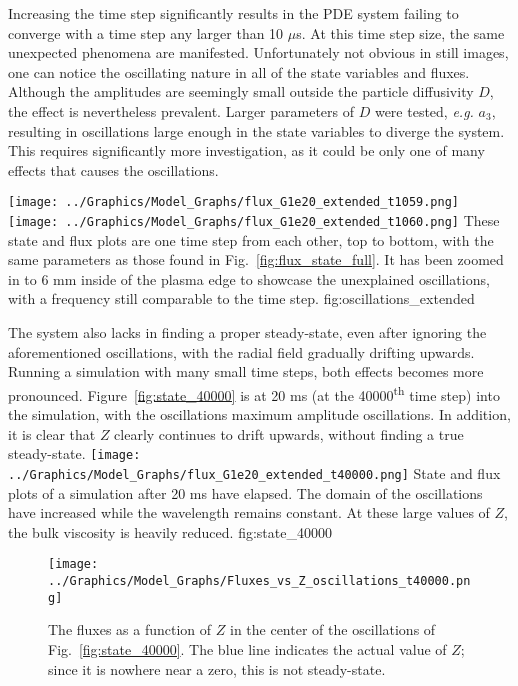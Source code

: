 Increasing the time step significantly results in the PDE system failing to converge with a time step any larger than 10 $\mu$s.
At this time step size, the same unexpected phenomena are manifested.
Unfortunately not obvious in still images, one can notice the oscillating nature in all of the state variables and fluxes.
Although the amplitudes are seemingly small outside the particle diffusivity $D$, the effect is nevertheless prevalent.
Larger parameters of $D$ were tested, \emph{e.g.} $a_3$, resulting in oscillations large enough in the state variables to diverge the system.
This requires significantly more investigation, as it could be only one of many effects that causes the oscillations.

	{\texttt{[image: ../Graphics/Model\_Graphs/flux\_G1e20\_extended\_t1059.png]}
	\texttt{[image: ../Graphics/Model\_Graphs/flux\_G1e20\_extended\_t1060.png]}}
	{These state and flux plots are one time step from each other, top to bottom, with the same parameters as those found in Fig.~\ref{fig:flux_state_full}.
	It has been zoomed in to 6 mm inside of the plasma edge to showcase the unexplained oscillations, with a frequency still comparable to the time step.}
	{fig:oscillations_extended}

The system also lacks in finding a proper steady-state, even after ignoring the aforementioned oscillations, with the radial field gradually drifting upwards.
Running a simulation with many small time steps, both effects becomes more pronounced.
Figure~\ref{fig:state_40000} is at 20 ms (at the 40000\textsuperscript{th} time step) into the simulation, with the oscillations maximum amplitude oscillations.
In addition, it is clear that $Z$ clearly continues to drift upwards, without finding a true steady-state.
	{\texttt{[image: ../Graphics/Model\_Graphs/flux\_G1e20\_extended\_t40000.png]}}
	{State and flux plots of a simulation after 20 ms have elapsed.
	The domain of the oscillations have increased while the wavelength remains constant.
	At these large values of $Z$, the bulk viscosity is heavily reduced.}
	{fig:state_40000}

\begin{figure}[!htb] %
	\centering
	\texttt{[image: ../Graphics/Model\_Graphs/Fluxes\_vs\_Z\_oscillations\_t40000.png]}
	\caption{The fluxes as a function of $Z$ in the center of the oscillations of Fig.~\ref{fig:state_40000}.
	The blue line indicates the actual value of $Z$; since it is nowhere near a zero, this is not steady-state.}
	\label{fig:fluxes_steady-state_40000}
\end{figure}

